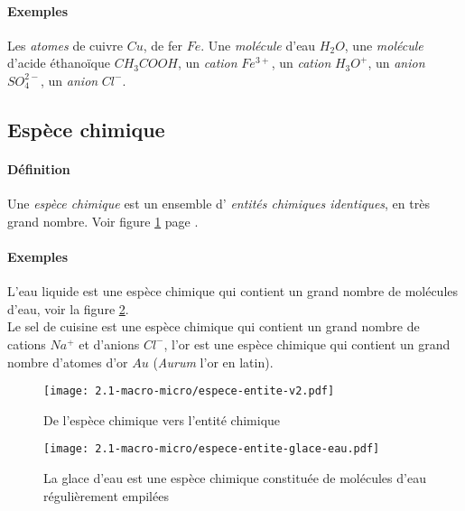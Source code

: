 \paragraph{Exemples}
Les \textit{atomes} de cuivre $Cu$, de fer $Fe$. Une \textit{molécule} d'eau $H_2O$, une 
\textit{molécule} d'acide éthanoïque $CH_3 COOH$, un \textit{cation} $Fe^{3+}$, 
un \textit{cation} $H_3O^{+}$, un \textit{anion} $SO_4^{2-}$, un \textit{anion}
$Cl^{-}$.

\subsection{Espèce chimique}
\paragraph{Définition} Une \textit{espèce chimique} est un ensemble d'\textit{
entités chimiques identiques}, en très grand nombre.
Voir figure \ref{fig:espece-vers-entite} page \pageref{fig:espece-vers-entite}.

\paragraph{Exemples} L'eau liquide est une espèce chimique qui contient un grand 
nombre de molécules d'eau, voir la figure \ref{fig:espece-vers-entite-glace-eau}.\\ Le sel de cuisine est une espèce chimique qui contient
un grand nombre de cations $Na^{+}$ et d'anions $Cl^{-}$, l'or est une espèce chimique
qui contient un grand nombre d'atomes d'or $Au$ (\textit{Aurum} l'or en latin).

\begin{figure}[!h]
  \begin{center}
      \texttt{[image: 2.1-macro-micro/espece-entite-v2.pdf]}
  \end{center}
  \caption{De l'espèce chimique vers l'entité chimique}
  \label{fig:espece-vers-entite}
\end{figure}

\begin{figure}[!h]
  \begin{center}
      \texttt{[image: 2.1-macro-micro/espece-entite-glace-eau.pdf]}
  \end{center}
  \caption{La glace d'eau est une espèce chimique constituée de molécules d'eau régulièrement empilées}
  \label{fig:espece-vers-entite-glace-eau}
\end{figure}


